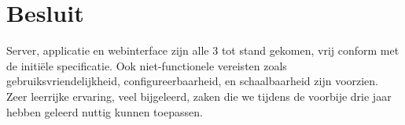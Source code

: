 
\chapter{Besluit}%


Server, applicatie en webinterface zijn alle 3 tot stand gekomen, vrij conform met de initiële specificatie.
Ook niet-functionele vereisten zoals gebruiksvriendelijkheid, configureerbaarheid, en schaalbaarheid zijn voorzien.
Zeer leerrijke ervaring, veel bijgeleerd, zaken die we tijdens de voorbije drie jaar hebben geleerd nuttig kunnen toepassen.